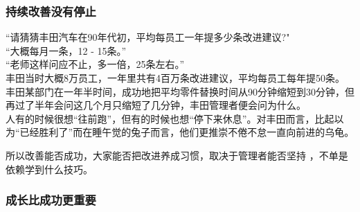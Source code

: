 

\hypertarget{ux6301ux7eedux6539ux5584ux6ca1ux6709ux505cux6b62}{%
\subsubsection{持续改善没有停止}\label{ux6301ux7eedux6539ux5584ux6ca1ux6709ux505cux6b62}}

``请猜猜丰田汽车在90年代初，平均每员工一年提多少条改进建议?"\\
``大概每月一条，12 - 15条。''\\
``老师这样问应不止，多一倍，25条左右。''\\
丰田当时大概8万员工，一年里共有4百万条改进建议，平均每员工每年提50条。\\
丰田某部门在一年半时间，成功地把平均零件替换时间从90分钟缩短到30分钟，但再过了半年会问这几个月只缩短了几分钟，丰田管理者便会问为什么。\\
人有的时候很想``往前跑''，但有的时候也想``停下来休息''。对丰田而言，比起以为``已经胜利了''而在睡午觉的兔子而言，他们更推崇不倦不怠一直向前进的乌龟。\\


所以改善能否成功，大家能否把改进养成习惯，取决于管理者能否坚持
，不单是依赖学到什么技巧。

\hypertarget{ux6210ux957fux6bd4ux6210ux529fux66f4ux91cdux8981}{%
\subsubsection{成长比成功更重要}\label{ux6210ux957fux6bd4ux6210ux529fux66f4ux91cdux8981}}

